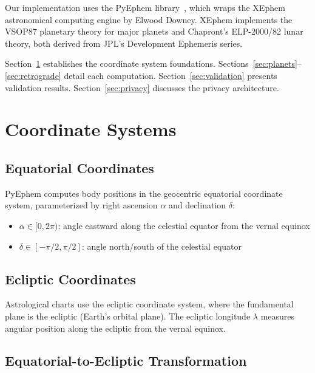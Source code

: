 \documentclass[11pt,letterpaper,twocolumn]{article}
\begin{document}
Our implementation uses the PyEphem library~\cite{pyephem}, which wraps the XEphem astronomical computing engine by Elwood Downey. XEphem implements the VSOP87 planetary theory for major planets and Chapront's ELP-2000/82 lunar theory, both derived from JPL's Development Ephemeris series.

Section~\ref{sec:coords} establishes the coordinate system foundations. Sections~\ref{sec:planets}--\ref{sec:retrograde} detail each computation. Section~\ref{sec:validation} presents validation results. Section~\ref{sec:privacy} discusses the privacy architecture.

\section{Coordinate Systems}\label{sec:coords}

\subsection{Equatorial Coordinates}

PyEphem computes body positions in the geocentric equatorial coordinate system, parameterized by right ascension $\alpha$ and declination $\delta$:

\begin{itemize}[nosep]
    \item $\alpha \in [0, 2\pi)$: angle eastward along the celestial equator from the vernal equinox
    \item $\delta \in [-\pi/2, \pi/2]$: angle north/south of the celestial equator
\end{itemize}

\subsection{Ecliptic Coordinates}

Astrological charts use the ecliptic coordinate system, where the fundamental plane is the ecliptic (Earth's orbital plane). The ecliptic longitude $\lambda$ measures angular position along the ecliptic from the vernal equinox.

\subsection{Equatorial-to-Ecliptic Transformation}
\end{document}
